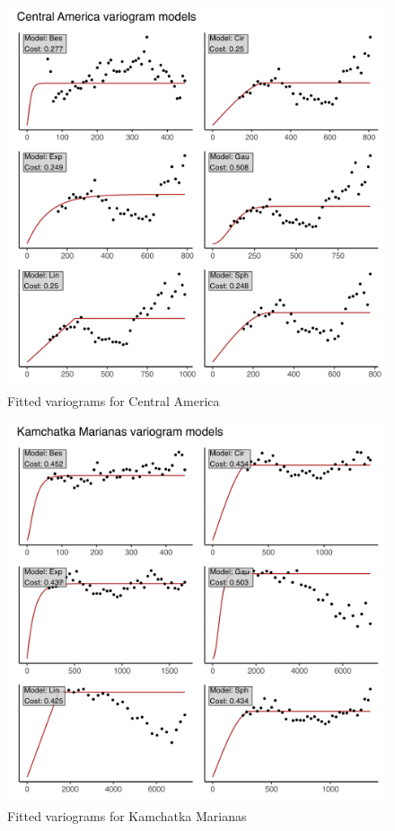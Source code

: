 \begin{figure}
\centering
\includegraphics{assets/figs/chpt3/CentralAmericaVgrms.png}
\caption[Fitted variograms for Central America]{Fitted variograms for Central America}
\end{figure}

\begin{figure}
\centering
\includegraphics{assets/figs/chpt3/KamchatkaMarianasVgrms.png}
\caption[Fitted variograms for Kamchatka Marianas]{Fitted variograms for Kamchatka Marianas}
\end{figure}

